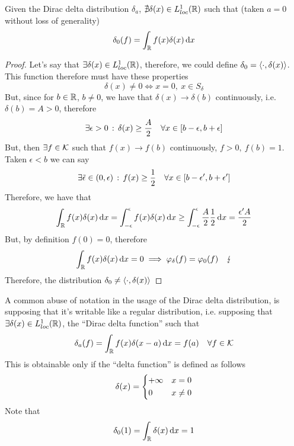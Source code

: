 \documentclass[../complete.tex]{subfiles}
\begin{document}
\begin{thm}
	Given the Dirac delta distribution $\delta_a$, $\nexists\delta(x)\in L^1_{loc}(\mathbb{R})$ such that (taken $a=0$ without loss of generality)
	\begin{equation*}
		\delta_0(f)=\int_{\mathbb{R}}^{}f(x)\delta(x)\operatorname{d\!} x
	\end{equation*}
\end{thm}
\begin{proof}
	Let's say that $\exists\delta(x)\in L^1_{loc}(\mathbb{R})$, therefore, we could define $\delta_0=\langle \cdot, \delta(x) \rangle$. This function therefore must have these properties
	\begin{equation*}
		\delta(x)\ne0\iff x=0,\ x\in S_\delta
	\end{equation*}
	But, since for $b\in\mathbb{R}$, $b\ne0$, we have that $\delta(x)\to\delta(b)$ continuously, i.e. $\delta(b)=A>0$, therefore
	\begin{equation*}
		\exists\epsilon>0\, :\, \delta(x)\ge\frac{A}{2}\quad\forall x\in[b-\epsilon,b+\epsilon]
	\end{equation*}
	But, then $\exists f\in\mathcal{K}$ such that $f(x)\to f(b)$ continuously, $f>0,\ f(b)=1$. Taken $\epsilon<b$ we can say
	\begin{equation*}
		\exists\tilde{\epsilon}\in(0,\epsilon)\, :\,  f(x)\ge\frac{1}{2}\quad\forall x\in[b-\epsilon',b+\epsilon']
	\end{equation*}
	Therefore, we have that
	\begin{equation*}
		\int_{\mathbb{R}}^{}f(x)\delta(x)\operatorname{d\!} x=\int_{-\epsilon}^{\epsilon}f(x)\delta(x)\operatorname{d\!} x\ge\int_{-\epsilon}^{\epsilon}\frac{A}{2}\frac{1}{2}\operatorname{d\!} x=\frac{\epsilon'A}{2}
	\end{equation*}
	But, by definition $f(0)=0$, therefore
	\begin{equation*}
		\int_{\mathbb{R}}^{}f(x)\delta(x)\operatorname{d\!} x=0\implies{}\varphi_\delta(f)=\varphi_0(f)\quad\lightning
	\end{equation*}
	Therefore, the distribution $\delta_0\ne\langle \cdot, \delta(x) \rangle$
\end{proof}
\begin{ntn}
	A common abuse of notation in the usage of the Dirac delta distribution, is supposing that it's writable like a regular distribution, i.e. supposing that $\exists\delta(x)\in L^1_{loc}(\mathbb{R})$, the ``Dirac delta function'' such that
	\begin{equation*}
		\delta_a(f)=\int_{\mathbb{R}}^{}f(x)\delta(x-a)\operatorname{d\!} x=f(a)\quad\forall f\in\mathcal{K}
	\end{equation*}
	This is obtainable only if the ``delta function'' is defined as follows
	\begin{equation}
		\delta(x)=\begin{dcases}
			+\infty&x=0\\
			0&x\ne0
		\end{dcases}
		\label{eq:deltafunction}
	\end{equation}
	Note that
	\begin{equation*}
		\delta_0(1)=\int_{\mathbb{R}}^{}\delta(x)\operatorname{d\!} x=1
	\end{equation*}
\end{ntn}
\end{document}

